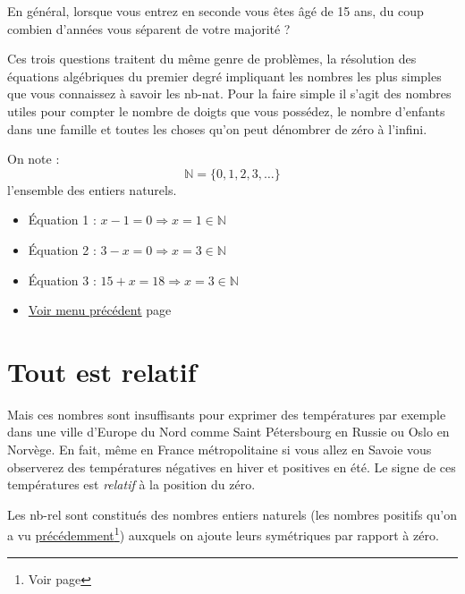 \documentclass[a4paper,11pt]{book}
\begin{document}
En général, lorsque vous entrez en seconde vous êtes âgé de 15 ans,
du coup combien d'années vous séparent de votre majorité ?

Ces trois questions traitent du même genre de problèmes, la
résolution des équations algébriques du premier degré impliquant
les nombres les plus simples que vous connaissez à savoir les
\gls{nb-nat}. Pour la
faire simple il s'agit des nombres utiles pour compter le nombre de
doigts que vous possédez, le nombre d'enfants dans une famille et
toutes les choses qu'on peut dénombrer de zéro à l'infini.

On note :
\[\mathbb{N} = \{0, 1, 2, 3,\dots\}\]
l'ensemble des entiers naturels.

\begin{itemize}
\item Équation 1 : \(x - 1 = 0\Rightarrow x = 1\in\mathbb{N}\)
\item Équation 2 : \(3 - x = 0\Rightarrow x = 3\in\mathbb{N}\)
\item Équation 3 : \(15 + x = 18\Rightarrow x = 3\in\mathbb{N}\)
\end{itemize}


\begin{itemize}
\item \hyperref[orga5086f2]{Voir menu précédent} 
page~\pageref{page:content1-menu}
\end{itemize}

\clearpage

\section{Tout est relatif}
\label{sec:org2a76b92}
\label{orgdf90d81}
\label{page:sec2.1.2int}

Mais ces nombres sont insuffisants pour exprimer des températures
par exemple dans une ville d'Europe du Nord comme Saint Pétersbourg
en Russie ou Oslo en Norvège. En fait, même en France
métropolitaine si vous allez en Savoie vous observerez des
températures négatives en hiver et positives en été. Le signe de ces
températures est \emph{relatif} à la position du zéro.

Les \gls{nb-rel} sont
constitués des nombres entiers naturels (les
nombres positifs qu'on a vu \hyperref[orgfb34aa0]{précédemment}\footnote{Voir page \pageref{page:sec2.1.1digits}}) auxquels on
ajoute leurs symétriques par rapport à zéro.
\end{document}
